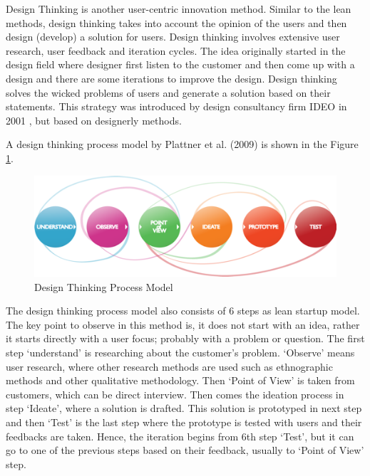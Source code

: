 Design Thinking is another user-centric innovation method. Similar to the lean methods, design thinking takes into account the opinion of the users and then design (develop) a solution for users. Design thinking involves extensive user research, user feedback and iteration cycles. The idea originally started in the design field where designer first listen to the customer and then come up with a design and there are some iterations to improve the design. Design thinking solves the wicked problems of users\citep{designthinkingWicked} and generate a solution based on their statements. This strategy was introduced by design consultancy firm IDEO in 2001 \citep{designthinkingIDEO}, but based on designerly methods. 





A design thinking process model by Plattner et al. (2009) \citep{designthinkingplattner} is shown in the Figure \ref{img:designthinking}.

\begin{figure}[H]
  \centering
  \includegraphics[width=.55\textwidth]{img/design-thinking-model.png}
  \caption{Design Thinking Process Model  \cite{designthinkingplattner}}\label{img:designthinking}
\end{figure}

The design thinking process model also consists of 6 steps as lean startup model. The key point to observe in this method is, it does not start with an idea, rather it starts directly with a user focus; probably with a problem or question. The first step `understand' is researching about the customer's problem. `Observe' means user research, where other research methods are used such as ethnographic methods and other qualitative methodology. Then `Point of View' is taken from customers, which can be direct interview. Then comes the ideation process in step `Ideate', where a solution is drafted. This solution is prototyped in next step and then `Test' is the last step where the prototype is tested with users and their feedbacks are taken. Hence, the iteration begins from 6th step `Test', but it can go to one of the previous steps based on their feedback, usually to `Point of View' step.

